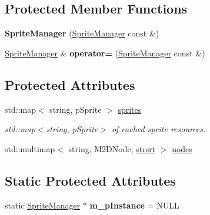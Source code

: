 \subsection*{Protected Member Functions}
\begin{DoxyCompactItemize}
\item 
\hypertarget{classSpriteManager_a66a70338940b875340d6bf3fa01308ab}{
{\bfseries SpriteManager} (\hyperlink{classSpriteManager}{SpriteManager} const \&)}
\label{classSpriteManager_a66a70338940b875340d6bf3fa01308ab}

\item 
\hypertarget{classSpriteManager_a2e955a289b86110e33da5ea2bac3b5eb}{
\hyperlink{classSpriteManager}{SpriteManager} \& {\bfseries operator=} (\hyperlink{classSpriteManager}{SpriteManager} const \&)}
\label{classSpriteManager_a2e955a289b86110e33da5ea2bac3b5eb}

\end{DoxyCompactItemize}
\subsection*{Protected Attributes}
\begin{DoxyCompactItemize}
\item 
\hypertarget{classSpriteManager_a1c77424ed84e626df83e096bed462a84}{
std::map$<$ string, pSprite $>$ \hyperlink{classSpriteManager_a1c77424ed84e626df83e096bed462a84}{sprites}}
\label{classSpriteManager_a1c77424ed84e626df83e096bed462a84}

\begin{DoxyCompactList}\small\item\em std::map$<$string, pSprite$>$ of cached sprite resources. \item\end{DoxyCompactList}\item 
std::multimap$<$ string, M2DNode, \hyperlink{structstrsrt}{strsrt} $>$ \hyperlink{classSpriteManager_a5156a8aad404a5c7f6b14183f1dd178b}{nodes}
\end{DoxyCompactItemize}
\subsection*{Static Protected Attributes}
\begin{DoxyCompactItemize}
\item 
\hypertarget{classSpriteManager_af01da77cb82294d7c9eea41cfa15d869}{
static \hyperlink{classSpriteManager}{SpriteManager} $\ast$ {\bfseries m\_\-pInstance} = NULL}
\label{classSpriteManager_af01da77cb82294d7c9eea41cfa15d869}

\end{DoxyCompactItemize}
